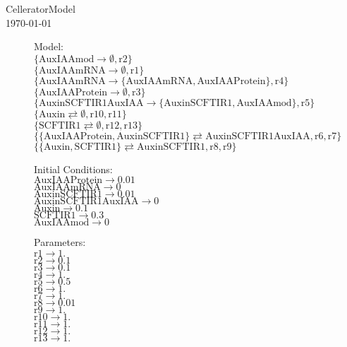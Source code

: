 \documentclass[12pt,letterpaper]{article}
\begin{document}
\begin{center}CelleratorModel
\\\today
\end{center}\begin{description}
\item[]Model:\\
$\{\text{AuxIAAmod}\rightarrow \emptyset ,\text{r2}\}$\\
$\{\text{AuxIAAmRNA}\rightarrow \emptyset ,\text{r1}\}$\\
$\{\text{AuxIAAmRNA}\rightarrow \{\text{AuxIAAmRNA},\text{AuxIAAProtein}\},\text{r4}\}$\\
$\{\text{AuxIAAProtein}\rightarrow \emptyset ,\text{r3}\}$\\
$\{\text{AuxinSCFTIR1AuxIAA}\rightarrow \{\text{AuxinSCFTIR1},\text{AuxIAAmod}\},\text{r5}\}$\\
$\{\text{Auxin}\rightleftarrows \emptyset ,\text{r10},\text{r11}\}$\\
$\{\text{SCFTIR1}\rightleftarrows \emptyset ,\text{r12},\text{r13}\}$\\
$\{\{\text{AuxIAAProtein},\text{AuxinSCFTIR1}\}\rightleftarrows \text{AuxinSCFTIR1AuxIAA},\text{r6},\text{r7}\}$\\
$\{\{\text{Auxin},\text{SCFTIR1}\}\rightleftarrows \text{AuxinSCFTIR1},\text{r8},\text{r9}\}$\\
\item[]Initial Conditions:\\
$\text{AuxIAAProtein}\to 0.01$\\
$\text{AuxIAAmRNA}\to 0$\\
$\text{AuxinSCFTIR1}\to 0.01$\\
$\text{AuxinSCFTIR1AuxIAA}\to 0$\\
$\text{Auxin}\to 0.1$\\
$\text{SCFTIR1}\to 0.3$\\
$\text{AuxIAAmod}\to 0$\\
\item[]Parameters:\\
$\text{r1}\to 1.$\\
$\text{r2}\to 0.1$\\
$\text{r3}\to 0.1$\\
$\text{r4}\to 1.$\\
$\text{r5}\to 0.5$\\
$\text{r6}\to 1.$\\
$\text{r7}\to 1.$\\
$\text{r8}\to 0.01$\\
$\text{r9}\to 1.$\\
$\text{r10}\to 1.$\\
$\text{r11}\to 1.$\\
$\text{r12}\to 1.$\\
$\text{r13}\to 1.$\\

\end{description}
\end{document}
